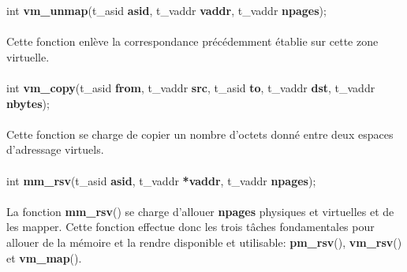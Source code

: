 \documentclass[10pt,a4wide]{article}
\begin{document}
\hspace{1.5cm}int \textbf{vm\_unmap}(t\_asid \textbf{asid},
                                     t\_vaddr \textbf{vaddr},
                                     t\_vaddr \textbf{npages});

\paragraph{}

Cette fonction enl\`eve la correspondance pr\'ec\'edemment \'etablie
sur cette zone virtuelle.

\paragraph{}

\hspace{1.5cm}int \textbf{vm\_copy}(t\_asid \textbf{from},
                                    t\_vaddr \textbf{src},
                                    t\_asid \textbf{to},
                                    t\_vaddr \textbf{dst},
                                    t\_vaddr \textbf{nbytes});

\paragraph{}

Cette fonction se charge de copier un nombre d'octets donn\'e entre
deux espaces d'adressage virtuels.

\paragraph{}

\hspace{1.5cm}int \textbf{mm\_rsv}(t\_asid \textbf{asid},
                                   t\_vaddr \textbf{*vaddr},
                                   t\_vaddr \textbf{npages});

\paragraph{}

La fonction \textbf{mm\_rsv}() se charge d'allouer \textbf{npages} physiques
et virtuelles et de les mapper. Cette fonction effectue donc les trois
t\^aches fondamentales pour allouer de la m\'emoire et la rendre disponible
et utilisable: \textbf{pm\_rsv}(), \textbf{vm\_rsv}() et \textbf{vm\_map}().

\paragraph{}
\end{document}
